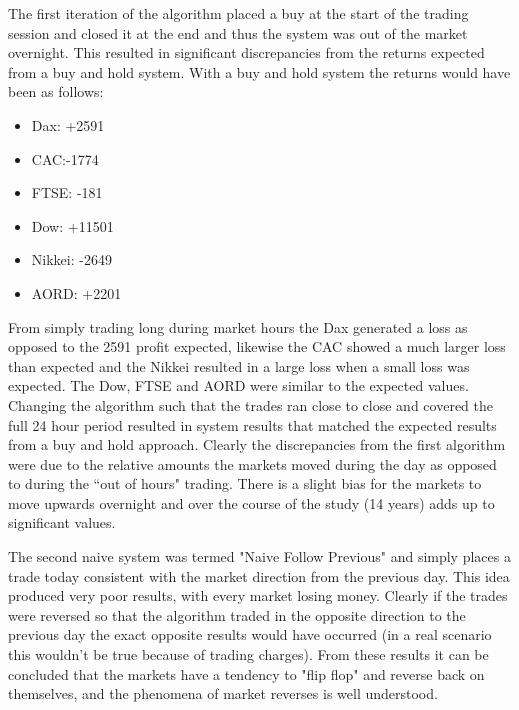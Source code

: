 The first iteration of the algorithm placed a buy at the start of the trading session and closed it at the end and thus the system was out of the market overnight. This resulted in significant discrepancies from the returns expected from a buy and hold system. With a buy and hold system the returns would have been as follows:

\begin{itemize}
\item Dax: +2591
\item CAC:-1774
\item FTSE: -181
\item Dow: +11501
\item Nikkei: -2649
\item AORD: +2201
\end{itemize}

From simply trading long during market hours the Dax generated a loss as opposed to the 2591 profit expected, likewise the CAC showed a much larger loss than expected and the Nikkei resulted in a large loss when a small loss was expected. The Dow, FTSE and AORD were similar to the expected values. Changing the algorithm such that the trades ran close to close and covered the full 24 hour period resulted in system results that matched the expected results from a buy and hold approach.  Clearly the discrepancies from the first algorithm were due to the relative amounts the markets moved during the day as opposed to during the \textquotedblleft out of hours" trading. There is a slight bias for the markets to move upwards overnight and over the course of the study (14 years) adds up to significant values.  

The second naive system was termed "Naive Follow Previous" and simply places a trade today consistent with the market direction from the previous day. This idea produced very poor results, with every market losing money. Clearly if the trades were reversed so that the algorithm traded in the opposite direction to the previous day the exact opposite results would have occurred (in a real scenario this wouldn't be true because of trading charges).  From these results it can be concluded that the markets have a tendency to "flip flop" and reverse back on themselves, and the phenomena of market reverses is well understood.


